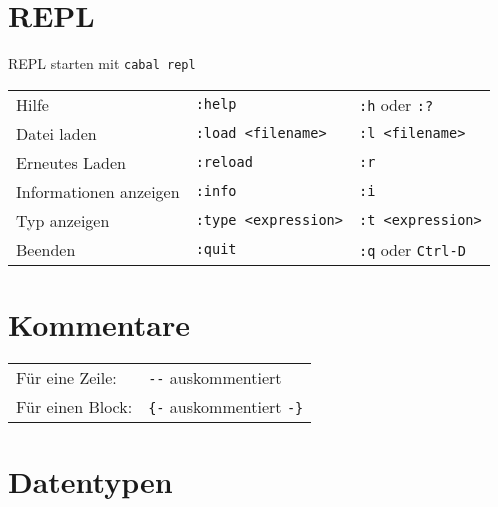 \documentclass[12pt,a4paper]{article}
\begin{document}
\pagestyle{fancyplain}
\chead{\thepage\vspace{0.1cm}} %
\cfoot{}  %


\section{REPL}

REPL starten mit \texttt{cabal repl} \\

\begin{tabular}{lll}
Hilfe & \texttt{:help} & \texttt{:h} oder \texttt{:?} \\
Datei laden & \texttt{:load <filename>} & \texttt{:l <filename>} \\
Erneutes Laden & \texttt{:reload} & \texttt{:r} \\
Informationen anzeigen & \texttt{:info} & \texttt{:i} \\
Typ anzeigen & \texttt{:type <expression>} & \texttt{:t <expression>} \\
Beenden & \verb#:quit# & \verb#:q# oder \verb#Ctrl-D#
\end{tabular}

\section{Kommentare}

\begin{tabular}{ll}
Für eine Zeile: & \verb#--# auskommentiert \\
Für einen Block: & \verb#{-# auskommentiert \verb#-}# \\
\end{tabular}

\section{Datentypen}
\end{document}
